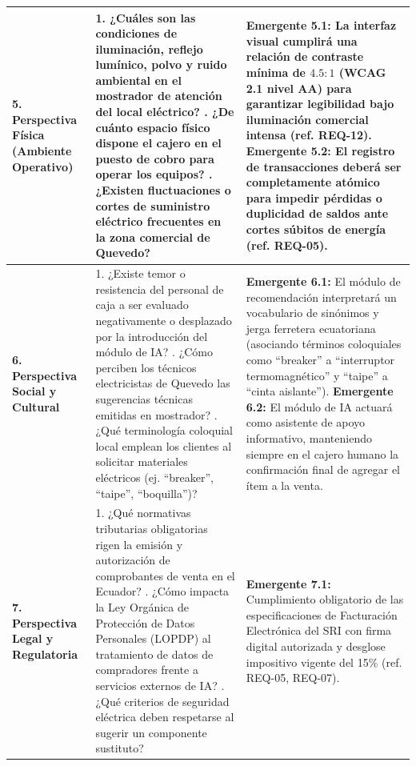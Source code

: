 \documentclass[conference,10pt]{IEEEtran}
\begin{document}
\begin{table}[htbp]
\begin{tabularx}{\textwidth}{>{\raggedright\arraybackslash}p{} Y Y}
			\midrule
			\textbf{5. Perspectiva Física (Ambiente Operativo)} &
			1. ¿Cuáles son las condiciones de iluminación, reflejo lumínico, polvo y ruido ambiental en el mostrador de atención del local eléctrico? . ¿De cuánto espacio físico dispone el cajero en el puesto de cobro para operar los equipos? . ¿Existen fluctuaciones o cortes de suministro eléctrico frecuentes en la zona comercial de Quevedo? &
			\textbf{Emergente 5.1:} La interfaz visual cumplirá una relación de contraste mínima de $4.5:1$ (WCAG 2.1 nivel AA) para garantizar legibilidad bajo iluminación comercial intensa (ref. REQ-12). \newline
			\textbf{Emergente 5.2:} El registro de transacciones deberá ser completamente atómico para impedir pérdidas o duplicidad de saldos ante cortes súbitos de energía (ref. REQ-05). \\
			\midrule
			\textbf{6. Perspectiva Social y Cultural} &
			1. ¿Existe temor o resistencia del personal de caja a ser evaluado negativamente o desplazado por la introducción del módulo de IA? . ¿Cómo perciben los técnicos electricistas de Quevedo las sugerencias técnicas emitidas en mostrador? . ¿Qué terminología coloquial local emplean los clientes al solicitar materiales eléctricos (ej. ``breaker'', ``taipe'', ``boquilla'')? &
			\textbf{Emergente 6.1:} El módulo de recomendación interpretará un vocabulario de sinónimos y jerga ferretera ecuatoriana (asociando términos coloquiales como ``breaker'' a ``interruptor termomagnético'' y ``taipe'' a ``cinta aislante''). \newline
			\textbf{Emergente 6.2:} El módulo de IA actuará como asistente de apoyo informativo, manteniendo siempre en el cajero humano la confirmación final de agregar el ítem a la venta. \\
			\midrule
			\textbf{7. Perspectiva Legal y Regulatoria} &
			1. ¿Qué normativas tributarias obligatorias rigen la emisión y autorización de comprobantes de venta en el Ecuador? . ¿Cómo impacta la Ley Orgánica de Protección de Datos Personales (LOPDP) al tratamiento de datos de compradores frente a servicios externos de IA? . ¿Qué criterios de seguridad eléctrica deben respetarse al sugerir un componente sustituto? &
			\textbf{Emergente 7.1:} Cumplimiento obligatorio de las especificaciones de Facturación Electrónica del SRI con firma digital autorizada y desglose impositivo vigente del 15\% (ref. REQ-05, REQ-07). \newline

\end{tabularx}
\end{table}
\end{document}
